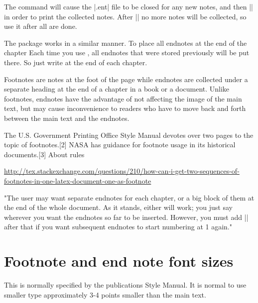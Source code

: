 The  command will cause the |.ent| file to be closed for any new
 notes, and then || in order to print the collected notes. After |\printnotes|
no more notes will be collected, so use it after all are done.

The  package works in a similar manner. To place all endnotes at the end of the chapter Each time you use \cmd{\theendnotes}, all endnotes that were stored previously will be put there. So just write \cmd{\theendnotes} at the end of each chapter.



Footnotes are notes at the foot of the page while endnotes are collected under a separate heading at the end of a chapter in a book or a document. Unlike footnotes, endnotes have the advantage of not affecting the image of the main text, but may cause inconvenience to readers who have to move back and forth between the main text and the endnotes.

The U.S. Government Printing Office Style Manual devotes over two pages to the topic of footnotes.[2] NASA has guidance for footnote usage in its historical documents.[3] About rules \pagenote{\notei}

\url{http://tex.stackexchange.com/questions/210/how-can-i-get-two-sequences-of-footnotes-in-one-latex-document-one-as-footnote}

 "The user may want separate endnotes for each chapter, or a big block of them at the end of the whole document. As it stands, either will work; you just say  wherever you want the endnotes so far to be inserted. However, you must add |\setcounter{endnote}{0}| after that if you want subsequent endnotes to start numbering at 1 again." 

\section*{Footnote and end note font sizes}

This is normally specified by the publications Style Manual. It is normal to use smaller type approximately 3-4 points smaller than the main text\pagenote{\noteii}\pagenote{\noteiv}.


